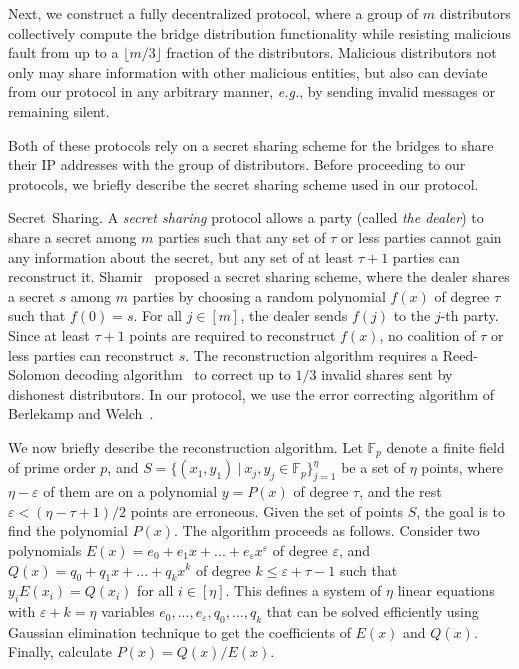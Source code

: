 \documentclass[USenglish,oneside,twocolumn]{article}
\newcommand{\fullpaper}[1]{#1}
\newcommand{\fullpaper}[1]{}
\newcommand{\eg}{\textit{e.g.}}
\newcommand{\sfsize}{\fontsize{0.68\baselineskip}{0.68\baselineskip}\selectfont}
\newcommand{\sans}[1]{\textsf{\sfsize \mbox{#1}}}
\newcommand{\para}[1]{\vspace{0.85em} \noindent \sans{{\mbox{#1}}}}
\begin{document}
Next, we construct a fully decentralized protocol, where a group of $m$ distributors collectively compute the bridge distribution functionality while resisting malicious fault from up to a $\lfloor m/3 \rfloor$ fraction of the distributors. Malicious distributors not only may share information with other malicious entities, but also can deviate from our protocol in any arbitrary manner, \eg, by sending invalid messages or remaining silent.

Both of these protocols rely on a secret sharing scheme for the bridges to share their IP addresses with the group of distributors. Before proceeding to our protocols, we briefly describe the secret sharing scheme used in our protocol.

\para{Secret Sharing.} A \emph{secret sharing} protocol allows a party (called \emph{the dealer}) to share a secret among $m$ parties such that any set of $\tau$ or less parties cannot gain any information about the secret, but any set of at least $\tau+1$ parties can reconstruct it. Shamir~\cite{shamir:how} proposed a secret sharing scheme, where the dealer shares a secret $s$ among $m$ parties by choosing a random polynomial $f(x)$ of degree $\tau$ such that ${f(0)=s}$. For all ${j \in [m]}$, the dealer sends $f(j)$ to the $j$-th party. Since at least ${\tau+1}$ points are required to reconstruct $f(x)$, no coalition of $\tau$ or less parties can reconstruct $s$.
The reconstruction algorithm requires a Reed-Solomon decoding algorithm~\cite{Reed-Solomon1960} to correct up to $1/3$ invalid shares sent by dishonest distributors. In our protocol, we use the error correcting algorithm of Berlekamp and Welch~\cite{Berlekamp:Welch:1986}.

\fullpaper{We now briefly describe the reconstruction algorithm. Let $\mathbb{F}_{p}$ denote a finite field of prime order $p$, and $S=\{(x_{1},y_{1})\:|\:x_{j},y_{j}\in\mathbb{F}_{p}\}_{j=1}^{\eta}$ be a set of $\eta$ points, where $\eta-\varepsilon$ of them are on a polynomial $y=P(x)$ of degree $\tau$, and the rest $\varepsilon<(\eta-\tau+1)/2$ points are erroneous. Given the set of points $S$, the goal is to find the polynomial $P(x)$. The algorithm proceeds as follows. Consider two polynomials $E(x)=e_{0}+e_{1}x+...+e_{\varepsilon}x^{\varepsilon}$ of degree $\varepsilon$, and $Q(x)=q_{0}+q_{1}x+...+q_{k}x^{k}$ of degree $k\leq\varepsilon+\tau-1$ such that $y_{i}E(x_{i})=Q(x_{i})$ for all $i\in[\eta]$. This defines a system of $\eta$ linear equations with $\varepsilon+k=\eta$ variables $e_{0},...,e_{\varepsilon},q_{0},...,q_{k}$ that can be solved efficiently using Gaussian elimination technique to get the coefficients of $E(x)$ and $Q(x)$. Finally, calculate $P(x)=Q(x)/E(x)$.}
\end{document}
